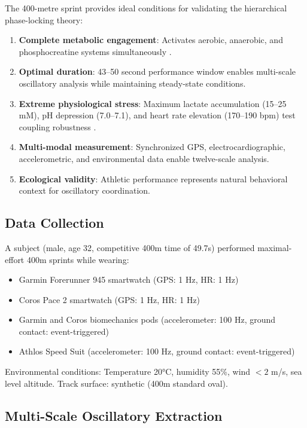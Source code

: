 \documentclass[12pt]{article}
\theoremstyle{remark}
\begin{document}
The 400-metre sprint provides ideal conditions for validating the hierarchical phase-locking theory:

\begin{enumerate}
\item \textbf{Complete metabolic engagement}: Activates aerobic, anaerobic, and phosphocreatine systems simultaneously \citep{spencer2005metabolism}.

\item \textbf{Optimal duration}: 43--50 second performance window enables multi-scale oscillatory analysis while maintaining steady-state conditions.

\item \textbf{Extreme physiological stress}: Maximum lactate accumulation (15--25 mM), pH depression (7.0--7.1), and heart rate elevation (170--190 bpm) test coupling robustness \citep{cairns2005lactic}.

\item \textbf{Multi-modal measurement}: Synchronized GPS, electrocardiographic, accelerometric, and environmental data enable twelve-scale analysis.

\item \textbf{Ecological validity}: Athletic performance represents natural behavioral context for oscillatory coordination.
\end{enumerate}

\subsection{Data Collection}

A subject (male, age 32, competitive 400m time of 49.7s) performed maximal-effort 400m sprints while wearing:
\begin{itemize}
\item Garmin Forerunner 945 smartwatch (GPS: 1 Hz, HR: 1 Hz)
\item Coros Pace 2 smartwatch (GPS: 1 Hz, HR: 1 Hz)
\item Garmin and Coros biomechanics pods (accelerometer: 100 Hz, ground contact: event-triggered)
\item Athlos Speed Suit (accelerometer: 100 Hz, ground contact: event-triggered)
\end{itemize}

Environmental conditions: Temperature 20°C, humidity 55\%, wind $< 2$ m/s, sea level altitude. Track surface: synthetic (400m standard oval).

\subsection{Multi-Scale Oscillatory Extraction}
\end{document}
